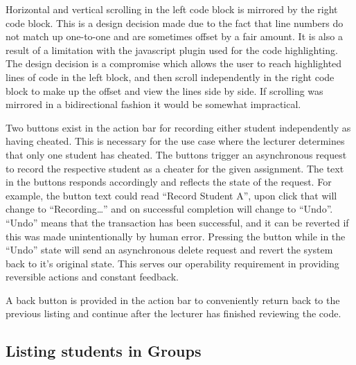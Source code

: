 \documentclass[11pt,a4paper]{article}
\begin{document}
Horizontal and vertical scrolling in the left code block is mirrored by the right code block. This is a design decision made due to the fact that line numbers do not match up one-to-one and are sometimes offset by a fair amount. It is also a result of a limitation with the javascript plugin used for the code highlighting. The design decision is a compromise which allows the user to reach highlighted lines of code in the left block, and then scroll independently in the right code block to make up the offset and view the lines side by side. If scrolling was mirrored in a bidirectional fashion it would be somewhat impractical.

Two buttons exist in the action bar for recording either student independently as having cheated. This is necessary for the use case where the lecturer determines that only one student has cheated. The buttons trigger an asynchronous request to record the respective student as a cheater for the given assignment. The text in the buttons responds accordingly and reflects the state of the request. For example, the button text could read “Record Student A”, upon click that will change to “Recording…” and on successful completion will change to “Undo”. “Undo” means that the transaction has been successful, and it can be reverted if this was made unintentionally by human error. Pressing the button while in the “Undo” state will send an asynchronous delete request and revert the system back to it’s original state. This serves our operability requirement in providing reversible actions and constant feedback.

A back button is provided in the action bar to conveniently return back to the previous listing and continue after the lecturer has finished reviewing the code.

\subsection{Listing students in Groups}
\end{document}
